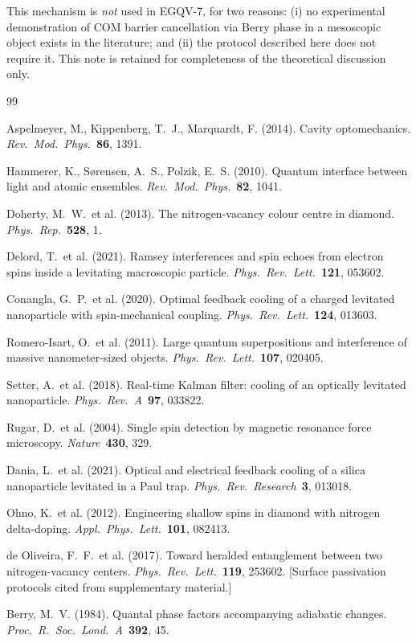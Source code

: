 \documentclass[12pt,a4paper]{article}
\begin{document}
This mechanism is \emph{not} used in EGQV-7, for two reasons: (i) no
experimental demonstration of COM barrier cancellation via Berry phase in a
mesoscopic object exists in the literature; and (ii) the protocol described here
does not require it. This note is retained for completeness of the theoretical
discussion only.


\begin{thebibliography}{99}

Aspelmeyer, M., Kippenberg, T.\ J., Marquardt, F. (2014).
Cavity optomechanics. \emph{Rev.\ Mod.\ Phys.}\ \textbf{86}, 1391.

Hammerer, K., S{\o}rensen, A.\ S., Polzik, E.\ S. (2010).
Quantum interface between light and atomic ensembles.
\emph{Rev.\ Mod.\ Phys.}\ \textbf{82}, 1041.

Doherty, M.\ W.\ et al. (2013).
The nitrogen-vacancy colour centre in diamond.
\emph{Phys.\ Rep.}\ \textbf{528}, 1.

Delord, T.\ et al. (2021).
Ramsey interferences and spin echoes from electron spins inside a levitating
macroscopic particle. \emph{Phys.\ Rev.\ Lett.}\ \textbf{121}, 053602.

Conangla, G.\ P.\ et al. (2020).
Optimal feedback cooling of a charged levitated nanoparticle with
spin-mechanical coupling. \emph{Phys.\ Rev.\ Lett.}\ \textbf{124}, 013603.

Romero-Isart, O.\ et al. (2011).
Large quantum superpositions and interference of massive nanometer-sized
objects. \emph{Phys.\ Rev.\ Lett.}\ \textbf{107}, 020405.

Setter, A.\ et al. (2018).
Real-time Kalman filter: cooling of an optically levitated nanoparticle.
\emph{Phys.\ Rev.\ A}\ \textbf{97}, 033822.

Rugar, D.\ et al. (2004).
Single spin detection by magnetic resonance force microscopy.
\emph{Nature}\ \textbf{430}, 329.

Dania, L.\ et al. (2021).
Optical and electrical feedback cooling of a silica nanoparticle levitated
in a Paul trap. \emph{Phys.\ Rev.\ Research}\ \textbf{3}, 013018.

Ohno, K.\ et al. (2012).
Engineering shallow spins in diamond with nitrogen delta-doping.
\emph{Appl.\ Phys.\ Lett.}\ \textbf{101}, 082413.

de Oliveira, F.\ F.\ et al. (2017).
Toward heralded entanglement between two nitrogen-vacancy centers.
\emph{Phys.\ Rev.\ Lett.}\ \textbf{119}, 253602.
[Surface passivation protocols cited from supplementary material.]

Berry, M.\ V. (1984).
Quantal phase factors accompanying adiabatic changes.
\emph{Proc.\ R.\ Soc.\ Lond.\ A}\ \textbf{392}, 45.

\end{thebibliography}
\end{document}
